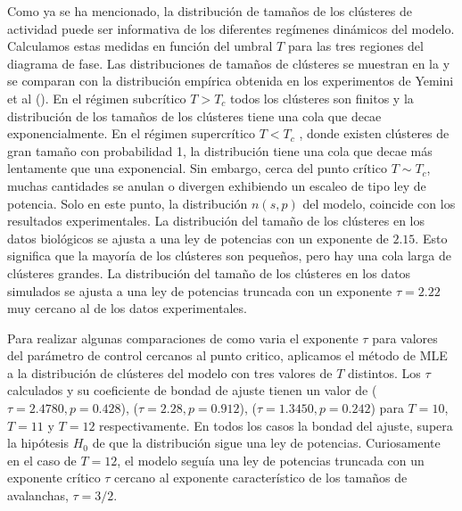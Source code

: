 Como ya se ha mencionado, la distribución de tamaños de los clústeres de actividad puede ser informativa de los diferentes regímenes dinámicos del modelo. Calculamos estas medidas en función del umbral $T$ para las tres regiones del diagrama de fase.  Las distribuciones de tamaños de clústeres se muestran en la  y se comparan con la distribución empírica obtenida en  los experimentos de Yemini et al ().   En el régimen subcrítico $T > T_c$ todos los clústeres son finitos y la distribución de los  tamaños de los clústeres tiene una cola que decae exponencialmente. En el régimen supercrítico $T < T_c$ , donde existen clústeres de gran tamaño  con probabilidad 1, la distribución tiene una cola que decae más lentamente que una exponencial. Sin embargo, cerca del punto crítico $ T\sim  T_c$, muchas cantidades se anulan o divergen exhibiendo un escaleo de tipo ley de potencia.  Solo en este punto, la distribución $n(s,p)$ del modelo, coincide con los resultados experimentales.    La distribución del tamaño de los clústeres en los datos biológicos se ajusta a una ley de potencias con un exponente de $2.15$. Esto significa que la mayoría de los clústeres son pequeños, pero hay una cola larga de clústeres grandes. La distribución del tamaño de los clústeres en los datos simulados se ajusta a una ley de potencias truncada con un exponente  $\tau = 2.22$ muy cercano al de los datos experimentales.  


Para realizar algunas comparaciones de como varia el exponente $\tau$ para  valores del parámetro de control cercanos al punto critico, aplicamos el método de MLE   a la distribución de clústeres del modelo con tres valores de $T$ distintos. Los $\tau$ calculados y su coeficiente de bondad de ajuste  tienen un valor de  ($\tau=2.4780, p=0.428$), ($\tau=2.28, p=0.912$), ($\tau=1.3450, p=0.242$) para $T=10$, $T=11$ y $T=12$ respectivamente. En todos los casos la bondad del ajuste, supera la hipótesis $H_0$ de que la distribución sigue una ley de potencias. Curiosamente en el caso de $T=12$, el modelo seguía una ley de potencias truncada con un exponente crítico $\tau$ cercano al exponente característico de los tamaños de avalanchas, $\tau = 3/2$. 



